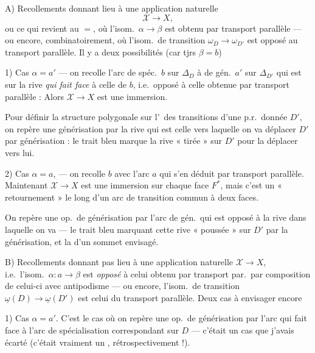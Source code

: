 \documentclass[11pt,a4paper]{article}
\begin{document}
A) Recollements donnant lieu à une application naturelle
\[
\mathcal{X} \to X,
\]
ou ce qui revient au $=$, où l'isom.\ $\alpha \to \beta$  est obtenu par transport parallèle --- ou encore, combinatoirement, où l'isom.\ de transition $\omega_D \to \omega_{D'}$ est opposé au transport parallèle. Il y a deux possibilités (car tjrs $\beta = b$)

1) Cas $\alpha = a'$ --- on recolle   l'arc de spéc.\ $b$ sur $\Delta_D$ à  \struck{\ill{}} de gén.\ $a'$ sur $\Delta_{D'}$ qui est sur la rive \emph{qui fait face} à celle de $b$, i.e.\ opposé à celle obtenue par transport parallèle :  Alors $\mathcal{X} \to X$ est une immersion. 

Pour définir la structure polygonale sur l'\ des transitions  d'une p.r.\ donnée $D'$, on repère  une générisation par la rive qui est  celle vers laquelle on va déplacer $D'$ par générisation : le trait bleu marque la rive « tirée » sur $D'$ pour la déplacer vers lui.

2) Cas $\alpha = a$, --- on recolle $b$ avec l'arc $a$ qui s'en déduit par transport parallèle. Maintenant $\mathcal{X} \to X$ est une immersion sur chaque face $F^{*}$, mais c'est un « retournement » le long d'un arc de transition commun à deux faces.

On repère une op.\ de générisation par \struck{\ill{}} l'arc de gén.\ qui est opposé à la rive dans laquelle on  va --- le trait bleu marquant cette rive « poussée » sur $D'$ par la générisation, et la  d'un sommet envisagé.

B) Recollements  donnant pas lieu à une application naturelle $\mathcal{X} \to X$, i.e.\ l'isom.\ $\alpha : a \to \beta$ est \emph{opposé} à celui obtenu par transport par.\ par composition de celui-ci avec antipodisme --- ou encore, l'isom.\ de transition $\underline{\omega}(D) \to \underline{\omega}(D')$ est  celui du transport parallèle. Deux cas à envisager encore

1) Cas $\alpha = a'$. C'est le cas où on repère une op.\ de générisation  par l'arc qui fait face à l'arc de spécialisation correspondant sur $D$ --- c'était un cas que  j'avais écarté (c'était vraiment un , rétrospectivement !).
\end{document}
